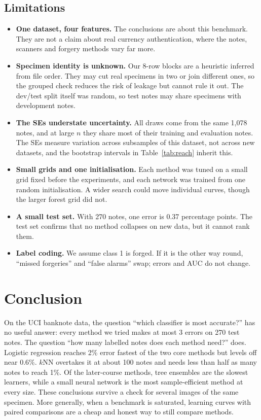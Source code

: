 \subsection*{Limitations}
\begin{itemize}
  \item \textbf{One dataset, four features.} The conclusions are about this benchmark. They are not a claim about real currency authentication, where the notes, scanners and forgery methods vary far more.
  \item \textbf{Specimen identity is unknown.} Our 8-row blocks are a heuristic inferred from file order. They may cut real specimens in two or join different ones, so the grouped check reduces the risk of leakage but cannot rule it out. The dev/test split itself was random, so test notes may share specimens with development notes.
  \item \textbf{The SEs understate uncertainty.} All draws come from the same 1,078 notes, and at large $n$ they share most of their training and evaluation notes. The SEs measure variation across subsamples of this dataset, not across new datasets, and the bootstrap intervals in Table~\ref{tab:reach} inherit this.
  \item \textbf{Small grids and one initialisation.} Each method was tuned on a small grid fixed before the experiments, and each network was trained from one random initialisation. A wider search could move individual curves, though the larger forest grid did not.
  \item \textbf{A small test set.} With 270 notes, one error is 0.37 percentage points. The test set confirms that no method collapses on new data, but it cannot rank them.
  \item \textbf{Label coding.} We assume class 1 is forged. If it is the other way round, ``missed forgeries'' and ``false alarms'' swap; errors and AUC do not change.
\end{itemize}

\section{Conclusion}
\label{sec:conclusion}
On the UCI banknote data, the question ``which classifier is most accurate?'' has no useful answer: every method we tried makes at most 3 errors on 270 test notes. The question ``how many labelled notes does each method need?'' does. Logistic regression reaches 2\% error fastest of the two core methods but levels off near 0.6\%. $k$NN overtakes it at about 100 notes and needs less than half as many notes to reach 1\%. Of the later-course methods, tree ensembles are the slowest learners, while a small neural network is the most sample-efficient method at every size. These conclusions survive a check for several images of the same specimen. More generally, when a benchmark is saturated, learning curves with paired comparisons are a cheap and honest way to still compare methods.

